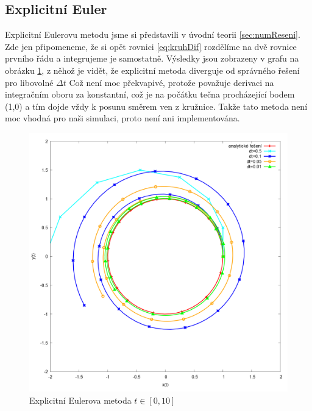 \subsection{Explicitní Euler}
Explicitní Eulerovu metodu jsme si představili v úvodní teorii \ref{sec:numReseni}. Zde jen připomeneme, že si opět rovnici \eqref{eq:kruhDif} rozdělíme na dvě rovnice prvního řádu a integrujeme je samostatně. Výsledky jsou zobrazeny v grafu na obrázku \ref{fig:explicitEuler}, z něhož je vidět, že explicitní metoda diverguje od správného řešení pro libovolné $ \Delta t $ Což není moc překvapivé, protože považuje derivaci na integračním oboru za konstantní, což je na počátku tečna procházející bodem (1,0) a tím dojde vždy k posunu směrem ven z kružnice. Takže tato metoda není moc vhodná pro naši simulaci, proto není ani implementována.
\begin{figure}
	\caption{Explicitní Eulerova metoda $ t\in [0,10] $}
	\label{fig:explicitEuler} 
	\centering
	\includegraphics[width=\linewidth]{Figs/explicitEuler}
\end{figure}
